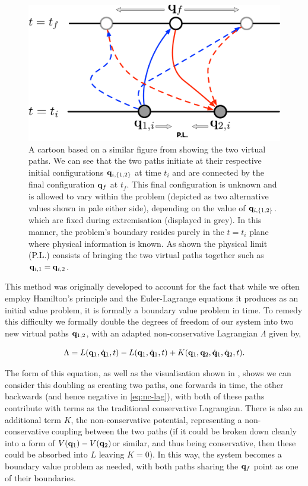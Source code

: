 \begin{figure}[t]
  \includegraphics[width=\columnwidth]{figures/qif-two-paths.pdf}
  \caption{A cartoon based on a similar figure from \cite{galleyClassicalMechanicsNonconservative2013} showing the two virtual paths. We can see that the two paths initiate at their respective initial configurations $\vb{q}_{i,\left\{1,2\right\}}$ at time $t_i$ and are connected by the final configuration $\vb{q}_f$ at $t_f$. This final configuration is unknown and is allowed to vary within the problem (depicted as two alternative values shown in pale either side), depending on the value of $\vb{q}_{i,\left\{1,2\right\}}$. which are fixed during extremisation (displayed in grey). In this manner, the problem's boundary resides purely in the $t = t_i$ plane where physical information is known. As shown the physical limit (P.L.) consists of bringing the two virtual paths together such as $\vb{q}_{i, 1} = \vb{q}_{i, 2}$.}
  \label{fig:nc-lagrange-virtual-paths}
\end{figure}

This method was originally developed to account for the fact that while we often employ Hamilton’s principle and the Euler-Lagrange equations it produces as an initial value problem, it is formally a boundary value problem in time. To remedy this difficulty we formally double the degrees of freedom of our system into two new virtual paths $\vb q_{1,2}$, with an adapted non-conservative Lagrangian $\Lambda$ given by,

\begin{equation}
  \label{eq:nc-lag}
  \Lambda = L(\vb{q}_1, \dot{\vb{q}}_1, t) - L(\vb{q}_1, \dot{\vb{q}}_1, t) + K(\vb{q}_1, \vb{q}_2, \dot{\vb{q}}_1, \dot{\vb{q}}_2, t).
\end{equation}

The form of this equation, as well as the visualisation shown in , shows we can consider this doubling as creating two paths, one forwards in time, the other backwards (and hence negative in \eqref{eq:nc-lag}), with both of these paths contribute with terms as the traditional conservative Lagrangian. There is also an additional term $K$, the non-conservative potential, representing a non-conservative coupling between the two paths (if it could be broken down cleanly into a form of $V(\vb{q}_1) - V(\vb{q}_2)$or similar, and thus being conservative, then these could be absorbed into $L$ leaving $K = 0$). In this way, the system becomes a boundary value problem as needed, with both paths sharing the $\vb{q}_f$ point as one of their boundaries.

